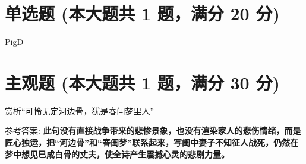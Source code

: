 \documentclass[12pt, a4paper, addpoints]{exam}
\begin{document}
\hspace{5cm}

\section{\normalsize{单选题 (本大题共 1 题，满分 20 分)}}
\hspace{1.5cm}

\begin{questions}
\question[20] PigD

\begin{oneparchoices}
\end{oneparchoices}

\end{questions}

\hspace{5cm}

\section{\normalsize{主观题 (本大题共 1 题，满分 30 分)}}
\hspace{1.5cm}

\begin{questions}
\question[30] 赏析“可怜无定河边骨，犹是春闺梦里人”

参考答案: \textbf{此句没有直接战争带来的悲惨景象，也没有渲染家人的悲伤情绪，而是匠心独运，把“河边骨”和“春闺梦”联系起来，写闺中妻子不知征人战死，仍然在梦中想见已成白骨的丈夫，使全诗产生震撼心灵的悲剧力量。}

\end{questions}
\end{document}
